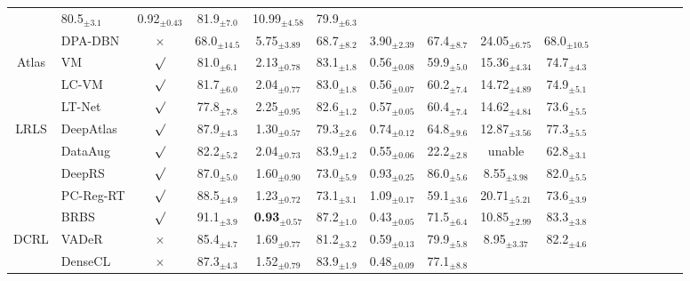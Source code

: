 \begin{table*}
{\begin{tabular}{clccccccccccccccc}
  &80.5$_{\pm3.1}$
  &0.92$_{\pm0.43}$
  &81.9$_{\pm7.0}$
  &10.99$_{\pm4.58}$
  &79.9$_{\pm6.3}$
  \\
  &DPA-DBN \cite{he2020dense}
  &$\times$
  &68.0$_{\pm14.5}$
  &5.75$_{\pm3.89}$
  &68.7$_{\pm8.2}$
  &3.90$_{\pm2.39}$
  &67.4$_{\pm8.7}$
  &24.05$_{\pm6.75}$
  &68.0$_{\pm10.5}$
  \\
  Atlas
  &VM \cite{ba2018un}
  &$\surd$
  &81.0$_{\pm6.1}$
  &2.13$_{\pm0.78}$
  &83.1$_{\pm1.8}$
  &0.56$_{\pm0.08}$
  &59.9$_{\pm5.0}$
  &15.36$_{\pm4.34}$
  &74.7$_{\pm4.3}$
  \\
  &LC-VM \cite{BalakrishnanVoxelMorph(u)}
  &$\surd$
  &81.7$_{\pm6.0}$
  &2.04$_{\pm0.77}$
  &83.0$_{\pm1.8}$
  &0.56$_{\pm0.07}$
  &60.2$_{\pm7.4}$
  &14.72$_{\pm4.89}$
  &74.9$_{\pm5.1}$
  \\
  &LT-Net \cite{wang2020lt}
  &$\surd$
  &77.8$_{\pm7.8}$
  &2.25$_{\pm0.95}$
  &82.6$_{\pm1.2}$
  &0.57$_{\pm0.05}$
  &60.4$_{\pm7.4}$
  &14.62$_{\pm4.84}$
  &73.6$_{\pm5.5}$
  \\
  LRLS
  &DeepAtlas \cite{xu2019deepatlas}
  &$\surd$
  &87.9$_{\pm4.3}$
  &1.30$_{\pm0.57}$
  &79.3$_{\pm2.6}$
  &0.74$_{\pm0.12}$
  &64.8$_{\pm9.6}$
  &12.87$_{\pm3.56}$
  &77.3$_{\pm5.5}$
  \\
  &DataAug \cite{zhao2019data}
  &$\surd$
  &82.2$_{\pm5.2}$
  &2.04$_{\pm0.73}$
  &83.9$_{\pm1.2}$
  &0.55$_{\pm0.06}$
  &22.2$_{\pm2.8}$
  &unable
  &62.8$_{\pm3.1}$
  \\
  &DeepRS \cite{he2020deep}
  &$\surd$
  &87.0$_{\pm5.0}$
  &1.60$_{\pm0.90}$
  &73.0$_{\pm5.9}$
  &0.93$_{\pm0.25}$
  &86.0$_{\pm5.6}$
  &8.55$_{\pm3.98}$
  &82.0$_{\pm5.5}$
  \\
  &PC-Reg-RT \cite{he2021few}
  &$\surd$
  &88.5$_{\pm4.9}$
  &1.23$_{\pm0.72}$
  &73.1$_{\pm3.1}$
  &1.09$_{\pm0.17}$
  &59.1$_{\pm3.6}$
  &20.71$_{\pm5.21}$
  &73.6$_{\pm3.9}$
  \\
  &BRBS \cite{he2022learning}
  &$\surd$
  &\color{blue}91.1$_{\pm3.9}$
  &\color{red}\textbf{0.93$_{\pm0.57}$}
  &\color{blue}87.2$_{\pm1.0}$
  &0.43$_{\pm0.05}$
  &71.5$_{\pm6.4}$
  &10.85$_{\pm2.99}$
  &83.3$_{\pm3.8}$
  \\
  DCRL
  &VADeR \cite{o2020unsupervised}
  &$\times$
  &85.4$_{\pm4.7}$
  &1.69$_{\pm0.77}$
  &81.2$_{\pm3.2}$
  &0.59$_{\pm0.13}$
  &79.9$_{\pm5.8}$
  &8.95$_{\pm3.37}$
  &82.2$_{\pm4.6}$
  \\
  &DenseCL \cite{wang2022densecl}
  &$\times$
  &87.3$_{\pm4.3}$
  &1.52$_{\pm0.79}$
  &83.9$_{\pm1.9}$
  &0.48$_{\pm0.09}$
  &77.1$_{\pm8.8}$

\end{tabular}}
\end{table*}

